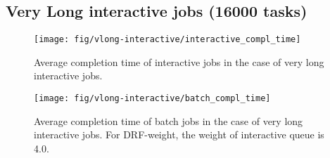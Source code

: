 \subsection{Very Long interactive jobs (16000 tasks)}

\begin{figure}
	\centering
	\texttt{[image: fig/vlong-interactive/interactive\_compl\_time]}
	\caption{Average completion time of interactive jobs in the case of very long interactive jobs.}
	\label{fig:vlong_interactive_compl_time}
\end{figure}

\begin{figure}
	\centering
	\texttt{[image: fig/vlong-interactive/batch\_compl\_time]}
	\caption{Average completion time of batch jobs in the case of very long interactive jobs. For DRF-weight, the weight of interactive queue is 4.0.}
	\label{fig:vlong_batch_compl_time}
\end{figure}


